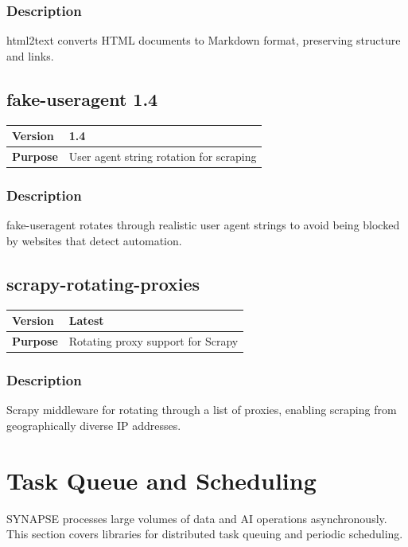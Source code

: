 \documentclass[12pt,a4paper]{report}
\begin{document}
\subsection{Description}

html2text converts HTML documents to Markdown format, preserving structure and links.

\section{fake-useragent 1.4}

\begin{tabular}{|p{4cm}|p{10cm}|}
\hline
\textbf{Version} & 1.4 \\
\hline
\textbf{Purpose} & User agent string rotation for scraping \\
\hline
\end{tabular}

\subsection{Description}

fake-useragent rotates through realistic user agent strings to avoid being blocked by websites that detect automation.

\section{scrapy-rotating-proxies}

\begin{tabular}{|p{4cm}|p{10cm}|}
\hline
\textbf{Version} & Latest \\
\hline
\textbf{Purpose} & Rotating proxy support for Scrapy \\
\hline
\end{tabular}

\subsection{Description}

Scrapy middleware for rotating through a list of proxies, enabling scraping from geographically diverse IP addresses.

\chapter{Task Queue and Scheduling}

SYNAPSE processes large volumes of data and AI operations asynchronously. This section covers libraries for distributed task queuing and periodic scheduling.
\end{document}
